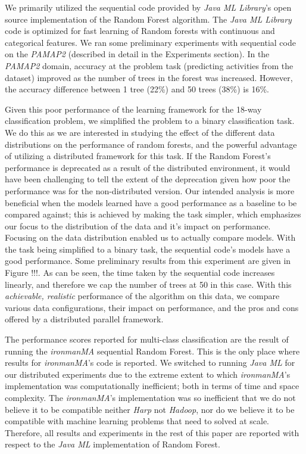 \documentclass{sig-alternate-05-2015}
\begin{document}
We primarily utilized the sequential code provided by \textit{Java ML Library}'s \cite{abeel2009java} open source implementation of the Random Forest algorithm. The \textit{Java ML Library} code is optimized for fast learning of Random forests with continuous and categorical features. We ran some preliminary experiments with \cite{seqCode} sequential code on the \textit{PAMAP2} \cite{reiss2012introducing,reiss2012creating} (described in detail in the Experiments section). In the \textit{PAMAP2} domain, accuracy at the problem task (predicting activities from the dataset) improved as the number of trees in the forest was increased. However, the accuracy difference between 1 tree (22\%) and 50 trees (38\%) is 16\%. 

Given this poor performance of the learning framework for the 18-way classification problem, we simplified the problem to a binary classification task. We do this as we are interested in studying the effect of the different data distributions on the performance of random forests, and the powerful advantage of utilizing a distributed framework for this task. If the Random Forest's performance is deprecated as a result of the distributed environment, it would have been challenging to tell the extent of the deprecation given how poor the performance was for the non-distributed version. Our intended analysis is more beneficial when the models learned have a good performance as a baseline to be compared against; this is achieved by making the task simpler, which emphasizes our focus to the distribution of the data and it's impact on performance. Focusing on the data distribution enabled us to actually compare models. With the task being simplified to a binary task, the sequential code's models have a good performance. Some preliminary results from this experiment are given in Figure !!!. As can be seen, the time taken by the sequential code increases linearly, and therefore we cap the number of trees at 50 in this case. With this \textit{achievable, realistic} performance of the algorithm on this data, we compare various data configurations, their impact on performance, and the pros and cons offered by a distributed parallel framework. 

The performance scores reported for multi-class classification are the result of running the \textit{ironmanMA} sequential Random Forest. This is the only place where results for  \textit{ironmanMA}'s code is reported. We switched to running \textit{Java ML} for our distributed experiments due to the extreme extent to which \textit{ironmanMA}'s implementation was computationally inefficient; both in terms of time and space complexity. The \textit{ironmanMA}'s implementation was so inefficient that we do not believe it to be compatible neither \textit{Harp} not \textit{Hadoop}, nor do we believe it to be compatible with machine learning problems that need to solved at scale. Therefore, all results and experiments in the rest of this paper are reported with respect to the \textit{Java ML} implementation of Random Forest.
\end{document}
